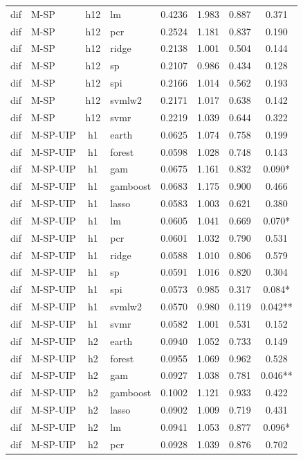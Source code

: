 \begin{ThreePartTable}
\begin{longtable}[t]{llclcccc}
dif & M-SP & h12 & lm & 0.4236 & 1.983 & 0.887 & 0.371\\
dif & M-SP & h12 & pcr & 0.2524 & 1.181 & 0.837 & 0.190\\
dif & M-SP & h12 & ridge & 0.2138 & 1.001 & 0.504 & 0.144\\
dif & M-SP & h12 & sp & 0.2107 & 0.986 & 0.434 & 0.128\\
dif & M-SP & h12 & spi & 0.2166 & 1.014 & 0.562 & 0.193\\
dif & M-SP & h12 & svmlw2 & 0.2171 & 1.017 & 0.638 & 0.142\\
dif & M-SP & h12 & svmr & 0.2219 & 1.039 & 0.644 & 0.322\\
\addlinespace
dif & M-SP-UIP & h1 & earth & 0.0625 & 1.074 & 0.758 & 0.199\\
dif & M-SP-UIP & h1 & forest & 0.0598 & 1.028 & 0.748 & 0.143\\
dif & M-SP-UIP & h1 & gam & 0.0675 & 1.161 & 0.832 & 0.090*\\
dif & M-SP-UIP & h1 & gamboost & 0.0683 & 1.175 & 0.900 & 0.466\\
dif & M-SP-UIP & h1 & lasso & 0.0583 & 1.003 & 0.621 & 0.380\\
dif & M-SP-UIP & h1 & lm & 0.0605 & 1.041 & 0.669 & 0.070*\\
dif & M-SP-UIP & h1 & pcr & 0.0601 & 1.032 & 0.790 & 0.531\\
dif & M-SP-UIP & h1 & ridge & 0.0588 & 1.010 & 0.806 & 0.579\\
dif & M-SP-UIP & h1 & sp & 0.0591 & 1.016 & 0.820 & 0.304\\
dif & M-SP-UIP & h1 & spi & 0.0573 & 0.985 & 0.317 & 0.084*\\
dif & M-SP-UIP & h1 & svmlw2 & 0.0570 & 0.980 & 0.119 & 0.042**\\
dif & M-SP-UIP & h1 & svmr & 0.0582 & 1.001 & 0.531 & 0.152\\
\addlinespace
dif & M-SP-UIP & h2 & earth & 0.0940 & 1.052 & 0.733 & 0.149\\
dif & M-SP-UIP & h2 & forest & 0.0955 & 1.069 & 0.962 & 0.528\\
dif & M-SP-UIP & h2 & gam & 0.0927 & 1.038 & 0.781 & 0.046**\\
dif & M-SP-UIP & h2 & gamboost & 0.1002 & 1.121 & 0.933 & 0.422\\
dif & M-SP-UIP & h2 & lasso & 0.0902 & 1.009 & 0.719 & 0.431\\
dif & M-SP-UIP & h2 & lm & 0.0941 & 1.053 & 0.877 & 0.096*\\
dif & M-SP-UIP & h2 & pcr & 0.0928 & 1.039 & 0.876 & 0.702\\

\end{longtable}
\end{ThreePartTable}
